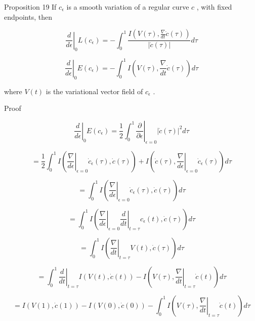 \documentclass[lang=cn,a4paper,11pt,openany,twoside]{elegantbook}
\begin{document}
Proposition 19 If \({c}_{\epsilon }\) is a smooth variation of a regular curve \(c\) , with fixed endpoints, then

\[
{\left. \frac{d}{d\epsilon }\right| }_{0}L\left( {c}_{\epsilon }\right)  =  - {\int }_{0}^{1}\frac{I\left( {V\left( \tau \right) ,\frac{\nabla }{dt}\dot{c}\left( \tau \right) }\right) }{\left| \dot{c}\left( \tau \right) \right| }{d\tau }
\]

\[
{\left. \frac{d}{d\epsilon }\right| }_{0}E\left( {c}_{\epsilon }\right)  =  - {\int }_{0}^{1}I\left( {V\left( \tau \right) ,\frac{\nabla }{dt}\dot{c}\left( \tau \right) }\right) {d\tau }
\]

where \(V\left( t\right)\) is the variational vector field of \({c}_{\epsilon }\) .

Proof

\[
{\left. \frac{d}{d\epsilon }\right| }_{0}E\left( {c}_{\epsilon }\right)  = {\left. \frac{1}{2}{\int }_{0}^{1}\frac{\partial }{\partial \epsilon }\right| }_{\epsilon  = 0}{\left| \dot{c}\left( \tau \right) \right| }^{2}{d\tau }
\]

\[
= \frac{1}{2}{\int }_{0}^{1}I\left( {{\left. \frac{\nabla }{d\epsilon }\right| }_{\epsilon  = 0}{\dot{c}}_{\epsilon }\left( \tau \right) ,\dot{c}\left( \tau \right) }\right)  + I\left( {{\left. \dot{c}\left( \tau \right) ,\frac{\nabla }{d\epsilon }\right| }_{\epsilon  = 0}{\dot{c}}_{\epsilon }\left( \tau \right) }\right) {d\tau }
\]

\[
= {\int }_{0}^{1}I\left( {{\left. \frac{\nabla }{d\epsilon }\right| }_{\epsilon  = 0}{\dot{c}}_{\epsilon }\left( \tau \right) ,\dot{c}\left( \tau \right) }\right) {d\tau }
\]

\[
= {\int }_{0}^{1}I\left( {{\left. \frac{\nabla }{d\epsilon }\right| }_{\epsilon  = 0}{\left. \frac{d}{dt}\right| }_{t = \tau }{c}_{\epsilon }\left( t\right) ,\dot{c}\left( \tau \right) }\right) {d\tau }
\]

\[
= {\int }_{0}^{1}I\left( {{\left. \frac{\nabla }{dt}\right| }_{t = \tau }V\left( t\right) ,\dot{c}\left( \tau \right) }\right) {d\tau }
\]

\[
= {\int }_{0}^{1}{\left. \frac{d}{dt}\right| }_{t = \tau }I\left( {V\left( t\right) ,\dot{c}\left( t\right) }\right)  - I\left( {V\left( \tau \right) ,{\left. \frac{\nabla }{dt}\right| }_{t = \tau }\dot{c}\left( t\right) }\right) {d\tau }
\]

\[
= I\left( {V\left( 1\right) ,\dot{c}\left( 1\right) }\right)  - I\left( {V\left( 0\right) ,\dot{c}\left( 0\right) }\right)  - {\int }_{0}^{1}I\left( {V\left( \tau \right) ,{\left. \frac{\nabla }{dt}\right| }_{t = \tau }\dot{c}\left( t\right) }\right) {d\tau }
\]
\end{document}
